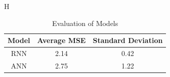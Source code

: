 \begin{table}{H}
\begin{center}
\begin{tabular}{ c | c | c }
    \hline
     \textbf{Model} &  \textbf{Average MSE} &    \textbf{Standard Deviation}\\ \hline
    RNN&  2.14&  0.42 \\ \hline
    ANN&  2.75&  1.22\\ \hline
      \hline
  \end{tabular}
\caption{Evaluation of Models}
 \label{table:nnRnn}
\end{center}
 \end{table}
 

 
 

